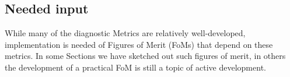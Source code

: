 \subsection{Needed input}

While many of the diagnostic Metrics are relatively well-developed,
implementation is needed of Figures of Merit (FoMs) that depend on
these metrics. In some Sections we have sketched out such figures of
merit, in others the development of a practical FoM is still a topic
of active development.






%
%

